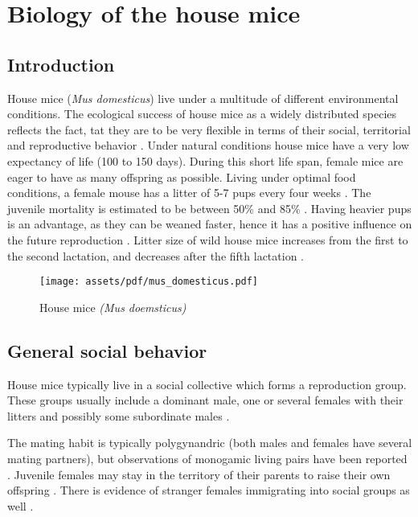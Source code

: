 \newpage
\section{Biology of the house mice}
\label{sec:biolhousemice}

\subsection{Introduction}
\label{subsec:introduction}

House mice (\textit{Mus domesticus}) live under a multitude of different environmental conditions. The ecological success of house mice as a widely distributed species reflects the fact, tat they are to be very flexible in terms of their social, territorial and reproductive behavior \cite{bronson:79, bronson:84, berry:81}. Under natural conditions house mice have a very low expectancy of life (100 to 150 days). During this short life span, female mice are eager to have as many offspring as possible. Living under optimal food conditions, a female mouse has a litter of 5-7 pups every four weeks \cite{berry:71, pelikan:81}. The juvenile mortality is estimated to be between 50\% and 85\% \cite{berry:71, berry:75, pennycuik:86}. Having heavier pups is an advantage, as they can be weaned faster, hence it has a positive influence on the future reproduction \cite{fuchs:82}. Litter size of wild house mice increases from the first to the second lactation, and decreases after the fifth lactation \cite{pelikan:81, koenig:87b}. 

\begin{figure}[htbp]	
\centering	
\texttt{[image: assets/pdf/mus\_domesticus.pdf]}	
\caption[House mice]{House mice \textit{(Mus doemsticus)}}
\label{fig:housemice}
\end{figure}

\subsection{General social behavior}
\label{subsec:socialbehaviour}
House mice typically live in a social collective which forms a reproduction group. These groups usually include a dominant male, one or several females with their litters and possibly some subordinate males \cite{crowcroft:63, reimer:67, selander:70, mackintosh:81}.

The mating habit is typically polygynandric (both males and females have several mating partners), but observations of monogamic living pairs have been reported \cite{lidicker:76}. Juvenile females may stay in the territory of their parents to raise their own offspring \cite{petras:67}. There is evidence of stranger females immigrating into social groups as well \cite{anderson:65, reimer:67, selander:70, bronson:79, baker:81}.     

